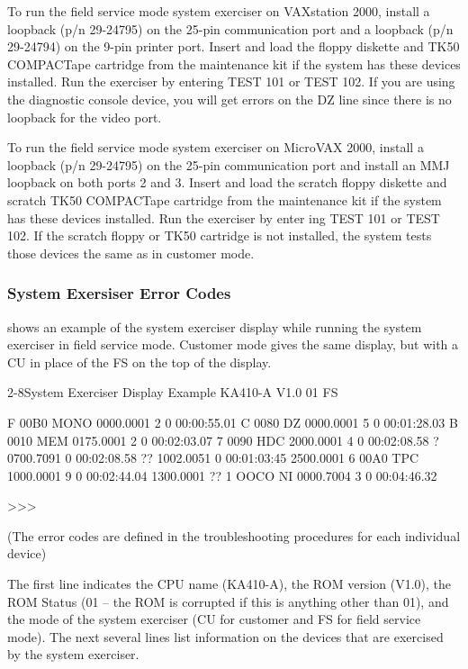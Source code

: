 To run the field service mode system exerciser on VAXstation 2000, install a
loopback (p/n 29-24795) on the 25-pin communication port and a loopback
(p/n 29-24794) on the 9-pin printer port. Insert and load the floppy diskette
and TK50 COMPACTape cartridge from the maintenance kit if the system
has these devices installed. Run the exerciser by entering TEST 101 or TEST
102. If you are using the diagnostic console device, you will get errors on
the DZ line since there is no loopback for the video port.

To run the field service mode system exerciser on MicroVAX 2000, install
a loopback (p/n 29-24795) on the 25-pin communication port and install an
MMJ loopback on both ports 2 and 3. Insert and load the scratch floppy
diskette and scratch TK50 COMPACTape cartridge from the maintenance
kit if the system has these devices installed. Run the exerciser by enter
ing TEST 101 or TEST 102. If the scratch floppy or TK50 cartridge is not
installed, the system tests those devices the same as in customer mode.

\subsubsection{System Exersiser Error Codes}

 shows an example of the system exerciser display while running
the system exerciser in field service mode. Customer mode gives the same
display, but with a CU in place of the FS on the top of the display.

\begin{ttfig}{2-8}{System Exerciser Display Example}
KA410-A V1.0          01     FS

   F  00B0    MONO    0000.0001      2      0 00:00:55.01
   C  0080    DZ      0000.0001      5      0 00:01:28.03
   B  0010    MEM     0175.0001      2      0 00:02:03.07
   7  0090    HDC     2000.0001      4      0 00:02:08.58
?                     0700.7091             0 00:02:08.58
??                    1002.0051             0 00:01:03:45
                      2500.0001
   6  00A0    TPC     1000.0001      9      0 00:02:44.04
                      1300.0001
?? 1  OOCO    NI      0000.7004      3      0 00:04:46.32

>>>

  (The error codes are defined in the troubleshooting
   procedures for each individual device)
\end{ttfig}

The first line indicates the CPU name (KA410-A), the ROM version (V1.0),
the ROM Status (01 -- the ROM is corrupted if this is anything other than
01), and the mode of the system exerciser (CU for customer and FS for field
service mode). The next several lines list information on the devices that
are exercised by the system exerciser.

